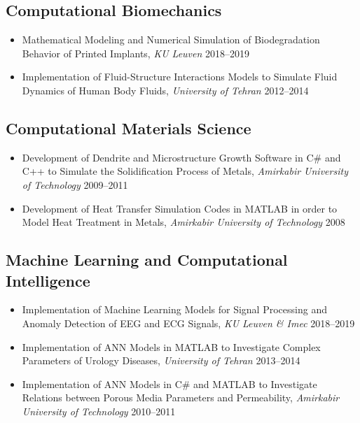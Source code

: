 \documentclass{cv}
\begin{document}
\subsection{Computational Biomechanics}

\begin{itemize}
\item
Mathematical Modeling and Numerical Simulation of Biodegradation Behavior of Printed Implants, \textit{KU Leuven} \hfill 2018--2019
\end{itemize}

\begin{itemize}
\item
Implementation of Fluid-Structure Interactions Models to Simulate Fluid Dynamics of Human Body Fluids, \textit{University of Tehran} \hfill 2012--2014
\end{itemize}

\subsection{Computational Materials Science}

\begin{itemize}
\item
Development of Dendrite and Microstructure Growth Software in C\# and C++ to Simulate the Solidification Process of Metals, \textit{Amirkabir University of Technology} \hfill 2009--2011
\item
Development of Heat Transfer Simulation Codes in MATLAB in order to Model Heat Treatment in Metals, \textit{Amirkabir University of Technology} \hfill 2008
\end{itemize}

\subsection{Machine Learning and Computational Intelligence}

\begin{itemize}
\item
Implementation of Machine Learning Models for Signal Processing and Anomaly Detection of EEG and ECG Signals, \textit{KU Leuven \& Imec} \hfill 2018--2019
\item
Implementation of ANN Models in MATLAB to Investigate Complex Parameters of Urology Diseases, \textit{University of Tehran} \hfill 2013--2014
\item
Implementation of ANN Models in C\# and MATLAB to Investigate Relations between Porous Media Parameters and Permeability, \textit{Amirkabir University of Technology} \hfill 2010--2011
\end{itemize}
\end{document}
